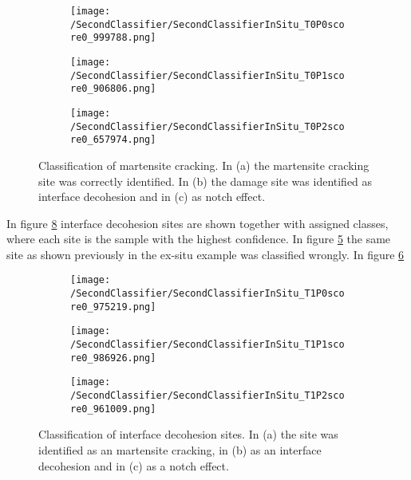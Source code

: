 \begin{figure}[H]
\centering
\begin{subfigure}{0.3\textwidth}
\texttt{[image: /SecondClassifier/SecondClassifierInSitu\_T0P0score0\_999788.png]}
\caption{}
\label{sub:InSituMartensiteSamplesM}
\end{subfigure}
\begin{subfigure}{0.3\textwidth}
\texttt{[image: /SecondClassifier/SecondClassifierInSitu\_T0P1score0\_906806.png]}
\caption{}
\label{sub:InSituMartensiteSamplesI}
\end{subfigure}
\begin{subfigure}{0.3\textwidth}
\texttt{[image: /SecondClassifier/SecondClassifierInSitu\_T0P2score0\_657974.png]}
\caption{}
\label{sub:InSituMartensiteSamplesN}
\end{subfigure}
\caption{Classification of martensite cracking. In (a) the martensite cracking site was correctly identified. In (b) the damage site was identified as interface decohesion and in (c) as notch effect. }
\label{fig:InSituMartensiteSamples}
\end{figure}

In figure \ref{fig:InSituInterfaceDecohesionSamples} interface decohesion sites are shown together with assigned classes, where each site is the sample with the highest confidence. In figure \ref{sub:InSituInterfaceDecohesionSamplesM} the same site as shown previously in the ex-situ example was classified wrongly. In figure \ref{sub:InSituInterfaceDecohesionSamplesID}

\begin{figure}[H]
\centering
\begin{subfigure}{0.3\textwidth}
\texttt{[image: /SecondClassifier/SecondClassifierInSitu\_T1P0score0\_975219.png]}
\caption{}
\label{sub:InSituInterfaceDecohesionSamplesM}
\end{subfigure}
\begin{subfigure}{0.3\textwidth}
\texttt{[image: /SecondClassifier/SecondClassifierInSitu\_T1P1score0\_986926.png]}
\caption{}
\label{sub:InSituInterfaceDecohesionSamplesID}
\end{subfigure}
\begin{subfigure}{0.3\textwidth}
\texttt{[image: /SecondClassifier/SecondClassifierInSitu\_T1P2score0\_961009.png]}
\caption{}
\label{sub:InSituInterfaceDecohesionSamplesN}
\end{subfigure}
\caption{Classification of interface decohesion sites. In (a) the site was identified as an martensite cracking, in (b) as an interface decohesion and in (c) as a notch effect. }
\label{fig:InSituInterfaceDecohesionSamples}
\end{figure}

